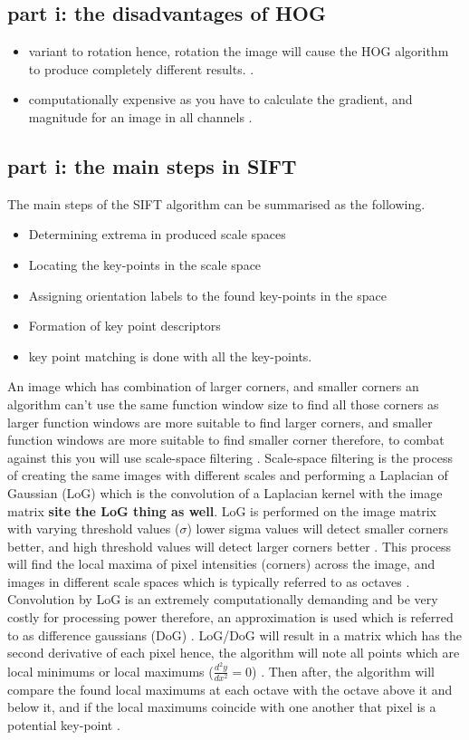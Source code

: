 \documentclass[conference]{IEEEtran}
\begin{document}
\subsection{part i: the disadvantages of HOG}
\begin{itemize}
	\item variant to rotation hence, rotation the image will cause the HOG algorithm to produce completely different results. \cite{b8}.
	\item computationally expensive as you have to calculate the gradient, and magnitude for an image in all channels \cite{b12}.
\end{itemize}

\subsection{part i: the main steps in SIFT}
The main steps of the SIFT algorithm can be summarised as the following.

\begin{itemize}
	\item Determining extrema in produced scale  spaces
	\item Locating the key-points in the scale space
	\item Assigning orientation labels to the found key-points in the space
	\item Formation of key point descriptors
	\item key point matching is done with all the key-points.
\end{itemize}

An image which has combination of larger corners, and smaller corners an algorithm can't use the same function window size to find all those corners as larger function windows are more suitable to find larger corners, and smaller function windows are more suitable to find smaller corner therefore, to combat against this you will use scale-space filtering \cite{b3}. Scale-space filtering is the process of creating the same images with different scales and performing a Laplacian of Gaussian (LoG) which is the convolution of a Laplacian kernel with the image matrix \cite{b3} \textbf{site the LoG thing as well}. LoG is performed on the image matrix with varying threshold values ($\sigma$) lower sigma values will detect smaller corners better, and high threshold values will detect larger corners better \cite{b3}. This process will find the local maxima of pixel intensities (corners) across the image, and images in different scale spaces which is typically referred to as octaves \cite{b3}. Convolution by LoG is an extremely computationally demanding and be very costly for processing power therefore, an approximation is used which is referred to as difference gaussians (DoG) \cite{b3}. LoG/DoG will result in a matrix which has the second derivative of each pixel hence, the algorithm will note all points which are local minimums or local maximums ($\frac{d^{2}y}{dx^{2}} = 0$) \cite{b3}. Then after, the algorithm will compare the found local maximums at each octave with the octave above it and below it, and if the local maximums coincide with one another that pixel is a potential key-point \cite{b3}.\par
\end{document}
